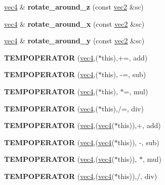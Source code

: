 \begin{DoxyCompactItemize}
\hyperlink{structvec4}{vec4} \& {\bfseries rotate\+\_\+around\+\_\+z} (const \hyperlink{structvec2}{vec2} \&sc)
\item 
\mbox{\label{structvec4_a24e2d262b8974d8537806c61151130a6}} 
\hyperlink{structvec4}{vec4} \& {\bfseries rotate\+\_\+around\+\_\+x} (const \hyperlink{structvec2}{vec2} \&sc)
\item 
\mbox{\label{structvec4_abb48ed4f2e2bb1870474ce7e4e511c15}} 
\hyperlink{structvec4}{vec4} \& {\bfseries rotate\+\_\+around\+\_\+y} (const \hyperlink{structvec2}{vec2} \&sc)
\item 
\mbox{\label{structvec4_a028b423135bf89d1b795db5cfb53e7b1}} 
{\bfseries T\+E\+M\+P\+O\+P\+E\+R\+A\+T\+OR} (\hyperlink{structvec4}{vec4},($\ast$this),+=, add)
\item 
\mbox{\label{structvec4_a6e1ae3808019a2661eda51cb1f71a838}} 
{\bfseries T\+E\+M\+P\+O\+P\+E\+R\+A\+T\+OR} (\hyperlink{structvec4}{vec4},($\ast$this), -\/=, sub)
\item 
\mbox{\label{structvec4_aa2c90aff5f14569257b60ac90ce84b16}} 
{\bfseries T\+E\+M\+P\+O\+P\+E\+R\+A\+T\+OR} (\hyperlink{structvec4}{vec4},($\ast$this), $\ast$=, mul)
\item 
\mbox{\label{structvec4_aa9d4e69a323d54c614f8c967490e569f}} 
{\bfseries T\+E\+M\+P\+O\+P\+E\+R\+A\+T\+OR} (\hyperlink{structvec4}{vec4},($\ast$this),/=, div)
\item 
\mbox{\label{structvec4_a78fcf0893b0e0927df6a20aa0fc6b009}} 
{\bfseries T\+E\+M\+P\+O\+P\+E\+R\+A\+T\+OR} (\hyperlink{structvec4}{vec4},(\hyperlink{structvec4}{vec4}($\ast$this)),+, add)
\item 
\mbox{\label{structvec4_a434a9b630a192a53027036da4d915ecc}} 
{\bfseries T\+E\+M\+P\+O\+P\+E\+R\+A\+T\+OR} (\hyperlink{structvec4}{vec4},(\hyperlink{structvec4}{vec4}($\ast$this)), -\/, sub)
\item 
\mbox{\label{structvec4_a4efccd684c4da11542fa1d3d0b7cda86}} 
{\bfseries T\+E\+M\+P\+O\+P\+E\+R\+A\+T\+OR} (\hyperlink{structvec4}{vec4},(\hyperlink{structvec4}{vec4}($\ast$this)), $\ast$, mul)
\item 
\mbox{\label{structvec4_a50df06d8911b6f1ddf1b98432e14b57b}} 
{\bfseries T\+E\+M\+P\+O\+P\+E\+R\+A\+T\+OR} (\hyperlink{structvec4}{vec4},(\hyperlink{structvec4}{vec4}($\ast$this)),/, div)
\end{DoxyCompactItemize}
